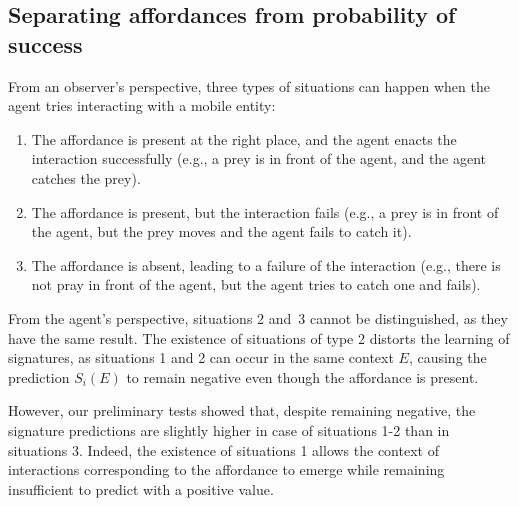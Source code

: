 \documentclass[conference]{IEEEtran}
\begin{document}


\subsection{Separating affordances from probability of success}\label{separate}

From an observer's perspective, three types of situations can happen when the agent tries interacting with a mobile entity:

\begin{enumerate}
\item The affordance is present at the right place, and the agent enacts the interaction successfully (e.g., a prey is in front of the agent, and the agent catches the prey).
\item The affordance is present, but the interaction fails (e.g., a prey is in front of the agent, but the prey moves and the agent fails to catch it).
\item The affordance is absent, leading to a failure of the interaction (e.g., there is not pray in front of the agent, but the agent tries to catch one and fails).
\end{enumerate}

From the agent's perspective, situations 2 and~3 cannot be distinguished, as they have the same result.
The existence of situations of type 2 distorts the learning of signatures, as situations 1 and 2 can occur in the same context $E$, causing the prediction $S_i(E)$ to remain negative even though the affordance is present.

However, our preliminary tests showed %
that, despite remaining negative, the signature predictions are slightly higher in case of situations 1-2 than in situations 3. Indeed, the existence of situations 1 allows the context of interactions corresponding to the affordance to emerge while remaining insufficient to predict with a positive value.
\end{document}
